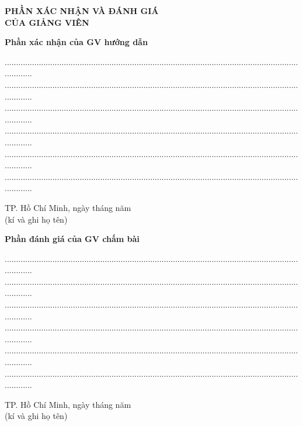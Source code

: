 \newpage
\begin{center}
\textbf{\Large{PHẦN XÁC NHẬN VÀ ĐÁNH GIÁ \\CỦA GIẢNG VIÊN}}
\end{center}
\textbf{Phần xác nhận của GV hướng dẫn}


\begin{center}
.............................................................................................................................................
.............................................................................................................................................
.............................................................................................................................................
.............................................................................................................................................
.............................................................................................................................................
.............................................................................................................................................
\\
\end{center}

\vspace{0.5cm}
\hspace{8cm}
TP. Hồ Chí Minh, ngày \hspace {0.5cm} tháng \hspace {0.5cm} năm\\	
\vspace{0.5cm}
\hspace{11cm}
(kí và ghi họ tên)

\vspace{2cm}



\begin{flushleft}
\textbf{\large{Phần đánh giá của GV chấm bài}}
\end{flushleft}
\begin{center}
.............................................................................................................................................
.............................................................................................................................................
.............................................................................................................................................
.............................................................................................................................................
.............................................................................................................................................
.............................................................................................................................................
\\
\end{center}

\vspace{0.5cm}
\hspace{8cm}
TP. Hồ Chí Minh, ngày \hspace {0.5cm} tháng \hspace {0.5cm} năm\\
\vspace{0.5cm}
\hspace{11cm}
(kí và ghi họ tên)


\newpage

